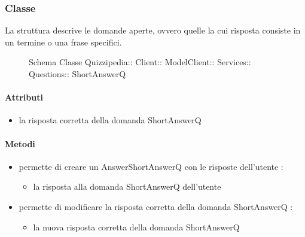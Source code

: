 \subsubsection{Classe }
La struttura descrive le domande aperte, ovvero quelle la cui risposta consiste in un termine o una frase specifici.
\begin{figure}[H]
\centering
\noindent{}
\caption[Schema Classe ShortAnswerQ]{Schema Classe Quizzipedia:: Client:: ModelClient:: Services:: Questions:: ShortAnswerQ}
\end{figure}
\paragraph{Attributi}
\begin{itemize}
\item {}
\newline
la risposta corretta della domanda ShortAnswerQ
\end{itemize}
\paragraph{Metodi}
\begin{itemize}
\item {}
\newline
permette di creare un AnswerShortAnswerQ con le risposte dell'utente
\newline
{} :
\begin{itemize}
\item {}
\newline
la risposta alla domanda ShortAnswerQ dell'utente
\end{itemize}
\item {}
\newline
permette di modificare la risposta corretta della domanda ShortAnswerQ
\newline
{} :
\begin{itemize}
\item {}
\newline
la nuova risposta corretta della domanda ShortAnswerQ
\end{itemize}
\end{itemize}

